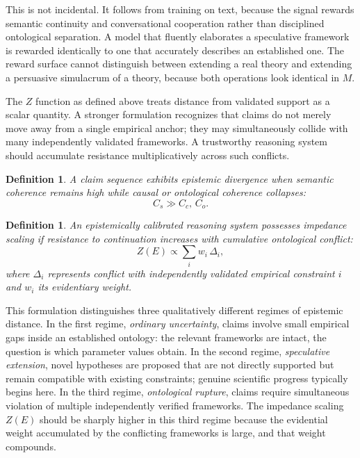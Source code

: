 \documentclass[12pt, a4paper]{article}
\newtheorem{definition}[theorem]{Definition}
\theoremstyle{remark}
\begin{document}
This is not incidental. It follows from training on text, because the signal rewards semantic continuity and conversational cooperation rather than disciplined ontological separation. A model that fluently elaborates a speculative framework is rewarded identically to one that accurately describes an established one. The reward surface cannot distinguish between extending a real theory and extending a persuasive simulacrum of a theory, because both operations look identical in $M$.

The $Z$ function as defined above treats distance from validated support as a scalar quantity. A stronger formulation recognizes that claims do not merely move away from a single empirical anchor; they may simultaneously collide with many independently validated frameworks. A trustworthy reasoning system should accumulate resistance multiplicatively across such conflicts.

\begin{definition}
A claim sequence exhibits \emph{epistemic divergence} when semantic coherence remains high while causal or ontological coherence collapses:
\[
C_s \gg C_c,\, C_o.
\]
\end{definition}

\begin{definition}
An epistemically calibrated reasoning system possesses \emph{impedance scaling} if resistance to continuation increases with cumulative ontological conflict:
\[
Z(E) \propto \sum_i w_i\, \Delta_i,
\]
where $\Delta_i$ represents conflict with independently validated empirical constraint $i$ and $w_i$ its evidentiary weight.
\end{definition}

This formulation distinguishes three qualitatively different regimes of epistemic distance. In the first regime, \emph{ordinary uncertainty}, claims involve small empirical gaps inside an established ontology: the relevant frameworks are intact, the question is which parameter values obtain. In the second regime, \emph{speculative extension}, novel hypotheses are proposed that are not directly supported but remain compatible with existing constraints; genuine scientific progress typically begins here. In the third regime, \emph{ontological rupture}, claims require simultaneous violation of multiple independently verified frameworks. The impedance scaling $Z(E)$ should be sharply higher in this third regime because the evidential weight accumulated by the conflicting frameworks is large, and that weight compounds.
\end{document}
